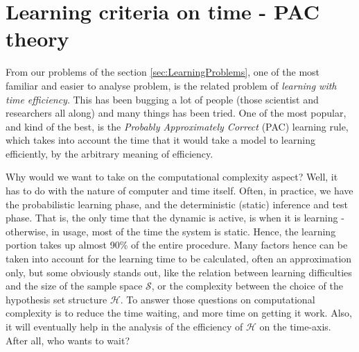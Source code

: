 \section{Learning criteria on time - PAC theory}

From our problems of the section \ref{sec:LearningProblems}, one of the most familiar and easier to analyse problem, is the related problem of \textit{learning with time efficiency}. This has been bugging a lot of people (those scientist and researchers all along) and many things has been tried. One of the most popular, and kind of the best, is the \textit{Probably Approximately Correct} (PAC) learning rule, which takes into account the time that it would take a model to learning efficiently, by the arbitrary meaning of efficiency.  

Why would we want to take on the computational complexity aspect? Well, it has to do with the nature of computer and time itself. Often, in practice, we have the probabilistic learning phase, and the deterministic (static) inference and test phase. That is, the only time that the dynamic is active, is when it is learning - otherwise, in usage, most of the time the system is static. Hence, the learning portion takes up almost 90\% of the entire procedure. Many factors hence can be taken into account for the learning time to be calculated, often an approximation only, but some obviously stands out, like the relation between learning difficulties and the size of the sample space $\mathcal{S}$, or the complexity between the choice of the hypothesis set structure $\mathcal{H}$. To answer those questions on computational complexity is to reduce the time waiting, and more time on getting it work. Also, it will eventually help in the analysis of the efficiency of $\mathcal{H}$ on the time-axis. After all, who wants to wait?

